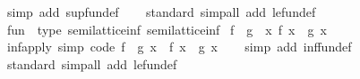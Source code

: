\begin{isabellebody}
\isamarkupfalse%
\ {\isacharparenleft}{\kern0pt}simp\ add{\isacharcolon}{\kern0pt}\ sup{\isacharunderscore}{\kern0pt}fun{\isacharunderscore}{\kern0pt}def{\isacharparenright}{\kern0pt}%
\endisatagproof
{\isafoldproof}%
%
\isadelimproof
\isanewline
%
\endisadelimproof
\isanewline
{}\isamarkupfalse%
\isanewline
%
\isadelimproof
\ \ %
\endisadelimproof
%
\isatagproof
{}\isamarkupfalse%
\ standard\ {\isacharparenleft}{\kern0pt}simp{\isacharunderscore}{\kern0pt}all\ add{\isacharcolon}{\kern0pt}\ le{\isacharunderscore}{\kern0pt}fun{\isacharunderscore}{\kern0pt}def{\isacharparenright}{\kern0pt}%
\endisatagproof
{\isafoldproof}%
%
\isadelimproof
\isanewline
%
\endisadelimproof
\isanewline
{}\isamarkupfalse%
\isanewline
\isanewline
{}\isamarkupfalse%
\ {\isachardoublequoteopen}fun{\isachardoublequoteclose}\ {\isacharcolon}{\kern0pt}{\isacharcolon}{\kern0pt}\ {\isacharparenleft}{\kern0pt}type{\isacharcomma}{\kern0pt}\ semilattice{\isacharunderscore}{\kern0pt}inf{\isacharparenright}{\kern0pt}\ semilattice{\isacharunderscore}{\kern0pt}inf\isanewline
{}\isanewline
\isanewline
{}\isamarkupfalse%
\ {\isachardoublequoteopen}f\ {\isasymsqinter}\ g\ {\isacharequal}{\kern0pt}\ {\isacharparenleft}{\kern0pt}{\isasymlambda}x{\isachardot}{\kern0pt}\ f\ x\ {\isasymsqinter}\ g\ x{\isacharparenright}{\kern0pt}{\isachardoublequoteclose}\isanewline
\isanewline
{}\isamarkupfalse%
\ inf{\isacharunderscore}{\kern0pt}apply\ {\isacharbrackleft}{\kern0pt}simp{\isacharcomma}{\kern0pt}\ code{\isacharbrackright}{\kern0pt}{\isacharcolon}{\kern0pt}\ {\isachardoublequoteopen}{\isacharparenleft}{\kern0pt}f\ {\isasymsqinter}\ g{\isacharparenright}{\kern0pt}\ x\ {\isacharequal}{\kern0pt}\ f\ x\ {\isasymsqinter}\ g\ x{\isachardoublequoteclose}\isanewline
%
\isadelimproof
\ \ %
\endisadelimproof
%
\isatagproof
{}\isamarkupfalse%
\ {\isacharparenleft}{\kern0pt}simp\ add{\isacharcolon}{\kern0pt}\ inf{\isacharunderscore}{\kern0pt}fun{\isacharunderscore}{\kern0pt}def{\isacharparenright}{\kern0pt}%
\endisatagproof
{\isafoldproof}%
%
\isadelimproof
\isanewline
%
\endisadelimproof
\isanewline
{}\isamarkupfalse%
%
\isadelimproof
\ %
\endisadelimproof
%
\isatagproof
{}\isamarkupfalse%
\ standard\ {\isacharparenleft}{\kern0pt}simp{\isacharunderscore}{\kern0pt}all\ add{\isacharcolon}{\kern0pt}\ le{\isacharunderscore}{\kern0pt}fun{\isacharunderscore}{\kern0pt}def{\isacharparenright}{\kern0pt}%
\endisatagproof
{\isafoldproof}%
%
\isadelimproof

\end{isabellebody}

